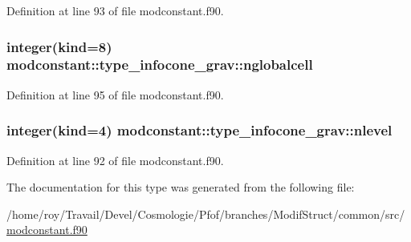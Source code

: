 Definition at line 93 of file modconstant.\-f90.

\hypertarget{structmodconstant_1_1type__infocone__grav_abad2550433b2e48e7e4b82ad05021b80}{
\subsubsection[{nglobalcell}]{\setlength{\rightskip}{0pt plus 5cm}integer(kind=8) modconstant\-::type\-\_\-infocone\-\_\-grav\-::nglobalcell}}\label{structmodconstant_1_1type__infocone__grav_abad2550433b2e48e7e4b82ad05021b80}


Definition at line 95 of file modconstant.\-f90.

\hypertarget{structmodconstant_1_1type__infocone__grav_a711b971de6fe902d47b0c0d562f27669}{
\subsubsection[{nlevel}]{\setlength{\rightskip}{0pt plus 5cm}integer(kind=4) modconstant\-::type\-\_\-infocone\-\_\-grav\-::nlevel}}\label{structmodconstant_1_1type__infocone__grav_a711b971de6fe902d47b0c0d562f27669}


Definition at line 92 of file modconstant.\-f90.



The documentation for this type was generated from the following file\-:\begin{DoxyCompactItemize}
\item 
/home/roy/\-Travail/\-Devel/\-Cosmologie/\-Pfof/branches/\-Modif\-Struct/common/src/\hyperlink{modconstant_8f90}{modconstant.\-f90}\end{DoxyCompactItemize}
